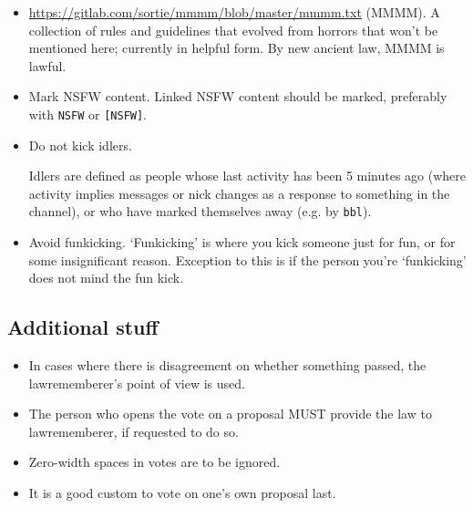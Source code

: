 \documentclass[11pt]{article}
\begin{document}
\begin{itemize}

\item \url{https://gitlab.com/sortie/mmmm/blob/master/mmmm.txt} (MMMM).
A collection of rules and guidelines that evolved from horrors that won't be mentioned here; currently in helpful form. By new ancient law, MMMM is lawful.

\item Mark NSFW content. Linked NSFW content should be marked, preferably with \texttt{NSFW} or \texttt{[NSFW]}.

\item Do not kick idlers.

Idlers are defined as people whose last activity has been 5 minutes ago (where activity implies messages or nick changes as a response to something in the channel), or who have marked themselves away (e.g. by \texttt{bbl}).

\item Avoid funkicking.
`Funkicking' is where you kick someone just for fun, or for some insignificant reason. Exception to this is if the person you're `funkicking' does not mind the fun kick.

\end{itemize}

\subsection{Additional stuff}

\begin{itemize}
\item In cases where there is disagreement on whether something passed, the lawrememberer's point of view is used.
\item The person who opens the vote on a proposal MUST provide the law to lawrememberer, if requested to do so.
\item Zero-width spaces in votes are to be ignored.
\item It is a good custom to vote on one's own proposal last.
\end{itemize}
\end{document}
